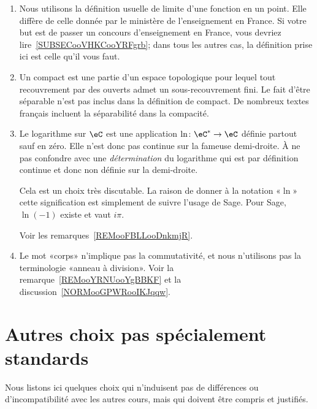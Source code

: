 \begin{enumerate}
    \item
        Nous utilisons la définition usuelle de limite d'une fonction en un point. Elle diffère de celle donnée par le ministère de l'enseignement en France. Si votre but est de passer un concours d'enseignement en France, vous devriez lire~\ref{SUBSECooVHKCooYRFgrb}; dans tous les autres cas, la définition prise ici est celle qu'il vous faut.
    \item
        Un compact est une partie d'un espace topologique pour lequel tout recouvrement par des ouverts admet un sous-recouvrement fini. Le fait d'être séparable n'est pas inclus dans la définition de compact. De nombreux textes français incluent la séparabilité dans la compacité.
    \item
        Le logarithme sur \( \eC\) est une application \( \ln\colon \eC^*\to \eC\) définie partout sauf en zéro. Elle n'est donc pas continue sur la fameuse demi-droite. À ne pas confondre avec une \emph{détermination} du logarithme qui est par définition continue et donc non définie sur la demi-droite.

        Cela est un choix très discutable. La raison de donner à la notation «\( \ln\)» cette signification est simplement de suivre l'usage de Sage. Pour Sage, \( \ln(-1)\) existe et vaut \( i\pi\).

        Voir les remarques~\ref{REMooFBLLooDnkmjR}.
    \item
        Le mot «corps» n'implique pas la commutativité, et nous n'utilisons pas la terminologie «anneau à division». Voir la remarque~\ref{REMooYRNUooYgBBKF} et la discussion~\ref{NORMooGPWRooIKJqqw}.
\end{enumerate}

\section{Autres choix pas spécialement standards}

Nous listons ici quelques choix qui n'induisent pas de différences ou d'incompatibilité avec les autres cours, mais qui doivent être compris et justifiés.

